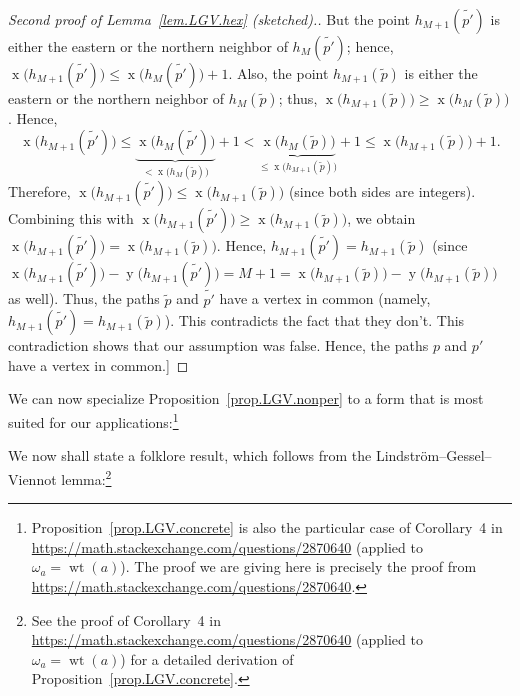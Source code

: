 \documentclass[reqno]{amsart}
\newcommand{\0}{\phantom{c}}
\DeclareMathOperator{\wt}{wt} %
\DeclareMathOperator{\xcoord}{x} %
\DeclareMathOperator{\ycoord}{y} %
\newenvironment{verlong}{}{}
\newenvironment{vershort}{}{}
\theoremstyle{plain}
\theoremstyle{definition}
\numberwithin{equation}{section}
\begin{document}
\begin{verlong}
\begin{proof}[Second proof of Lemma~\ref{lem.LGV.hex} (sketched).]
But the point $h_{M+1}(\widetilde{p'})$ is either the eastern or the northern neighbor of $h_{M}(\widetilde{p'})$; hence, $\xcoord\bigl( h_{M+1}(\widetilde{p'}) \bigr) \leq \xcoord\bigl( h_{M}(\widetilde{p'}) \bigr) + 1$.
Also, the point $h_{M+1}(\widetilde{p})$ is either the eastern or the northern neighbor of $h_{M}(\widetilde{p})$; thus, $\xcoord\bigl( h_{M+1}(\widetilde{p}) \bigr) \geq \xcoord\bigl( h_{M}(\widetilde{p}) \bigr)$.
Hence,
\[
\xcoord\bigl( h_{M+1}(\widetilde{p'}) \bigr) \leq \underbrace{\xcoord\bigl( h_{M}(\widetilde{p'}) \bigr)}_{<\xcoord\bigl( h_{M}(\widetilde{p}) \bigr)} + 1 < \underbrace{\xcoord\bigl( h_{M}(\widetilde{p}) \bigr)}_{\leq\xcoord\bigl( h_{M+1}(\widetilde{p}) \bigr)} + 1 \leq \xcoord\bigl( h_{M+1}(\widetilde{p}) \bigr) + 1.
\]
Therefore, $\xcoord\bigl( h_{M+1}(\widetilde{p'}) \bigr) \leq \xcoord\bigl( h_{M+1}(\widetilde{p}) \bigr)$ (since both sides are integers).
Combining this with $\xcoord\bigl( h_{M+1}(\widetilde{p'}) \bigr) \geq \xcoord\bigl( h_{M+1}(\widetilde{p}) \bigr)$, we obtain $\xcoord\bigl( h_{M+1}(\widetilde{p'}) \bigr) = \xcoord\bigl( h_{M+1}(\widetilde{p}) \bigr)$.
Hence, $h_{M+1}(\widetilde{p'}) = h_{M+1}(\widetilde{p})$ (since $\xcoord\bigl( h_{M+1}(\widetilde{p'}) \bigr) -\ycoord\bigl( h_{M+1}(\widetilde{p'}) \bigr) = M + 1 = \xcoord\bigl( h_{M+1}(\widetilde{p}) \bigr) - \ycoord( h_{M+1}(\widetilde{p}) \bigr)$ as well).
Thus, the paths $\widetilde{p}$ and $\widetilde{p'}$ have a vertex in common (namely, $h_{M+1}(\widetilde{p'}) = h_{M+1}(\widetilde{p})$).
This contradicts the fact that they don't.
This contradiction shows that our assumption was false.
Hence, the paths $p$ and $p'$ have a vertex in common.]
\end{proof}

We can now specialize Proposition~\ref{prop.LGV.nonper} to a form that is most
suited for our applications:\footnote{%
Proposition~\ref{prop.LGV.concrete} is also the particular case of Corollary~4 in \url{https://math.stackexchange.com/questions/2870640} (applied to $\omega_{a} = \wt(a)$).
The proof we are giving here is precisely the proof from \url{https://math.stackexchange.com/questions/2870640}.}
\end{verlong}

\begin{vershort}
We now shall state a folklore result, which follows from the Lindstr\"om--Gessel--Viennot lemma:\footnote{%
See the proof of Corollary~4 in \url{https://math.stackexchange.com/questions/2870640} (applied to $\omega_{a} = \wt(a)$) for a detailed derivation of Proposition~\ref{prop.LGV.concrete}.}
\end{vershort}
\end{document}

